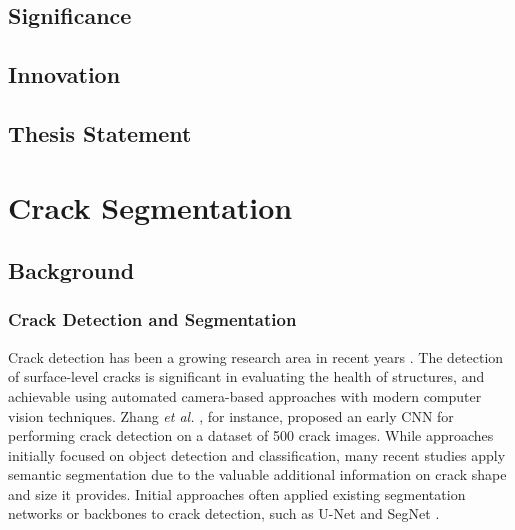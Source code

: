 \documentclass[a4paper,12pt]{report}
\begin{document}
\section{Significance}


\section{Innovation}

\section{Thesis Statement}

\chapter{Crack Segmentation}

\section{Background}
\subsection{Crack Detection and Segmentation}
Crack detection has been a growing research area in recent years \cite{hamishebahar_comprehensive_2022}. The detection of surface-level cracks is significant in evaluating the health of structures, and achievable using automated camera-based approaches with modern computer vision techniques. Zhang \textit{et al.} \cite{zhang_road_2016}, for instance, proposed an early CNN for performing crack detection on a dataset of 500 crack images. While approaches initially focused on object detection and classification, many recent studies apply semantic segmentation \cite{hamishebahar_comprehensive_2022} due to the valuable additional information on crack shape and size it provides. Initial approaches often applied existing segmentation networks or backbones to crack detection, such as U-Net \cite{david_jenkins_deep_2018} and SegNet \cite{chen_pavement_2020}.
\end{document}
